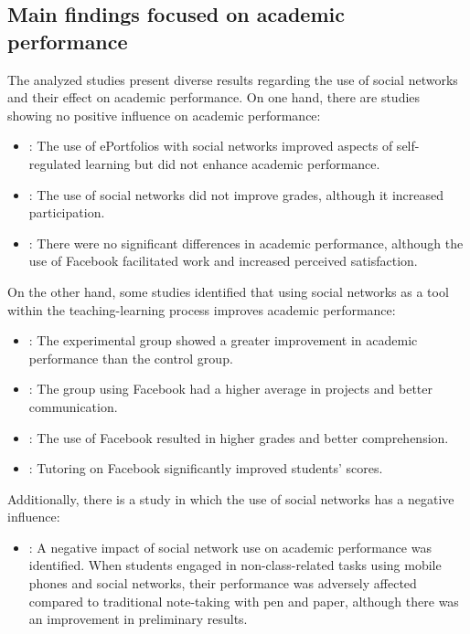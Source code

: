 \documentclass[english]{textolivre}
\begin{document}
\subsection{Main findings focused on academic performance}
The analyzed studies present diverse results regarding the use of social networks and their effect on academic performance. On one hand, there are studies showing no positive influence on academic performance:

\begin{itemize}
    \item \textcite{alexiou2020}: The use of ePortfolios with social networks improved aspects of self-regulated learning but did not enhance academic performance.
\item \textcite{almarzouki2022}: The use of social networks did not improve grades, although it increased participation.
\item \textcite{penalba2020}: There were no significant differences in academic performance, although the use of Facebook facilitated work and increased perceived satisfaction.
\end{itemize}
\medskip

On the other hand, some studies identified that using social networks as a tool within the teaching-learning process improves academic performance:

\begin{itemize}
\item \textcite{perezsuasnavas2022}: The experimental group showed a greater improvement in academic performance than the control group.
\item \textcite{salasrueda2019}: The group using Facebook had a higher average in projects and better communication.
\item \textcite{salasrueda2018}: The use of Facebook resulted in higher grades and better comprehension.
\item \textcite{zulkifli2018}: Tutoring on Facebook significantly improved students’ scores.
\end{itemize}
\medskip
Additionally, there is a study in which the use of social networks has a negative influence:

\begin{itemize}
\item \textcite{demirbilek2018}: A negative impact of social network use on academic performance was identified. When students engaged in non-class-related tasks using mobile phones and social networks, their performance was adversely affected compared to traditional note-taking with pen and paper, although there was an improvement in preliminary results.
\end{itemize}
\end{document}

